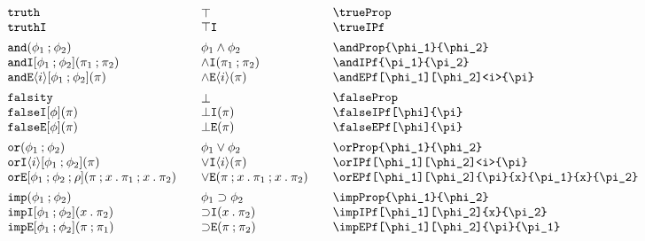 \documentclass[11pt]{article}
\begin{document}
\begin{figure}

  \begin{small}
    \begin{displaymath}
      \begin{array}{l@{\qquad}l@{\qquad}l@{\qquad}l}
        \trueProp                                       & \trueProp*                       & \verb|\trueProp|                                       \\
        \trueIPf                                        & \trueIPf*                        & \verb|\trueIPf|                                        \\[1ex]

        \andProp{\phi_1}{\phi_2}                        & \andProp*{\phi_1}{\phi_2}        & \verb|\andProp{\phi_1}{\phi_2}|                        \\
        \andIPf{\pi_1}{\pi_2}                           & \andIPf*{\pi_1}{\pi_2}           & \verb|\andIPf{\pi_1}{\pi_2}|                           \\
        \andEPf[\phi_1][\phi_2]<i>{\pi}                 & \andEPf*<i>{\pi}                 & \verb|\andEPf[\phi_1][\phi_2]<i>{\pi}|                 \\[1ex]

        \falseProp                                      & \falseProp*                      & \verb|\falseProp|                                      \\
        \falseIPf[\phi]{\pi}                            & \falseIPf*{\pi}                  & \verb|\falseIPf[\phi]{\pi}|                            \\
        \falseEPf[\phi]{\pi}                            & \falseEPf*{\pi}                  & \verb|\falseEPf[\phi]{\pi}|                            \\[1ex]

        \orProp{\phi_1}{\phi_2}                         & \orProp*{\phi_1}{\phi_2}         & \verb|\orProp{\phi_1}{\phi_2}|                         \\
        \orIPf[\phi_1][\phi_2]<i>{\pi}                  & \orIPf*<i>{\pi}                  & \verb|\orIPf[\phi_1][\phi_2]<i>{\pi}|                  \\
        \orEPf[\phi_1][\phi_2]{\pi}{x}{\pi_1}{x}{\pi_2} & \orEPf*{\pi}{x}{\pi_1}{x}{\pi_2} & \verb|\orEPf[\phi_1][\phi_2]{\pi}{x}{\pi_1}{x}{\pi_2}| \\[1ex]

        \impProp{\phi_1}{\phi_2}                        & \impProp*{\phi_1}{\phi_2}        & \verb|\impProp{\phi_1}{\phi_2}|                        \\
        \impIPf[\phi_1][\phi_2]{x}{\pi_2}               & \impIPf*{x}{\pi_2}               & \verb|\impIPf[\phi_1][\phi_2]{x}{\pi_2}|               \\
        \impEPf[\phi_1][\phi_2]{\pi}{\pi_1}             & \impEPf*{\pi}{\pi_2}             & \verb|\impEPf[\phi_1][\phi_2]{\pi}{\pi_1}|             \\[1ex]


\end{array}
\end{displaymath}
\end{small}
\end{figure}
\end{document}
